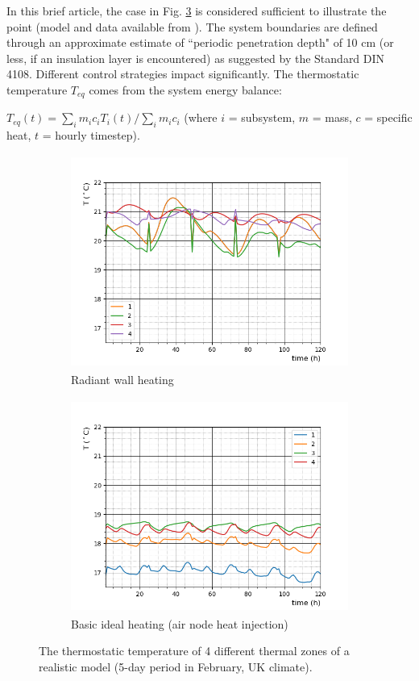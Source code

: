 \documentclass[10pt]{extarticle} %
\begin{document}
In this brief article, the case in Fig. \ref{fig:casestudy} is considered sufficient to illustrate the point (model and data available from \cite{Bonetti2020}). The system boundaries are defined through an approximate estimate of ``periodic penetration depth" of 10 cm (or less, if an insulation layer is encountered) as suggested by the Standard DIN 4108. Different control strategies impact significantly. The thermostatic temperature $T_{eq}$ comes from the system energy balance: 

$T_{eq}(t)={\sum_i m_i c_i T_i(t)} / {\sum_i m_i c_i}$  \quad  (where $i$ = subsystem, $m$ = mass, $c$ = specific heat, $t$ = hourly timestep).

\vskip-0.35cm


\begin{figure}[h]
 
\begin{subfigure}{0.5\textwidth}
\includegraphics[width=0.99\linewidth, height=7cm]{images/1.png} 
\caption{Radiant wall heating}
\label{fig:esprmodel}
\end{subfigure}
\begin{subfigure}{0.5\textwidth}
\includegraphics[width=0.99\linewidth, height=7cm]{images/2.png}
\caption{Basic ideal heating (air node heat injection)}
\label{fig:constructionelements}
\end{subfigure}
 \vskip-0.2cm
\caption{The thermostatic temperature of 4 different thermal zones of a realistic model (5-day period in February, UK climate).}
\label{fig:casestudy}
\end{figure}
\end{document}
